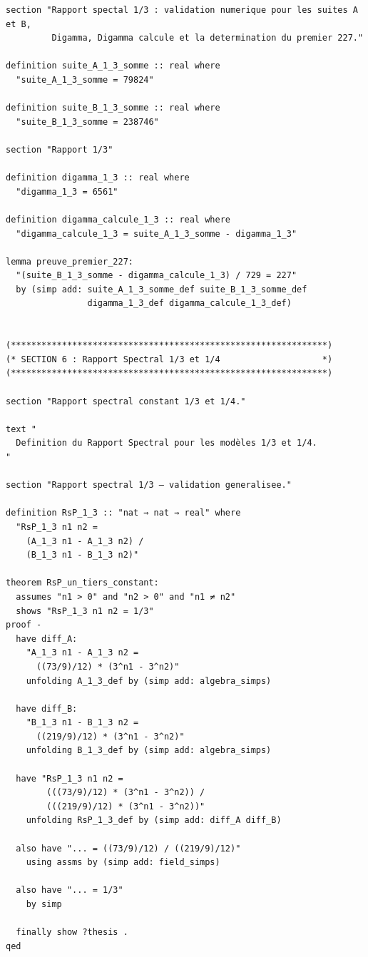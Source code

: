 \documentclass[a4paper,11pt]{article}
\begin{document}
\begin{holcode}[title={\textcolor{white}{File: methode\_spectral.thy -- Part 3/4}}]
\begin{lstlisting}
section "Rapport spectal 1/3 : validation numerique pour les suites A et B, 
         Digamma, Digamma calcule et la determination du premier 227."

definition suite_A_1_3_somme :: real where
  "suite_A_1_3_somme = 79824"

definition suite_B_1_3_somme :: real where
  "suite_B_1_3_somme = 238746"

section "Rapport 1/3"

definition digamma_1_3 :: real where
  "digamma_1_3 = 6561"

definition digamma_calcule_1_3 :: real where
  "digamma_calcule_1_3 = suite_A_1_3_somme - digamma_1_3"

lemma preuve_premier_227:
  "(suite_B_1_3_somme - digamma_calcule_1_3) / 729 = 227"
  by (simp add: suite_A_1_3_somme_def suite_B_1_3_somme_def
                digamma_1_3_def digamma_calcule_1_3_def)


(**************************************************************)
(* SECTION 6 : Rapport Spectral 1/3 et 1/4                    *)
(**************************************************************)

section "Rapport spectral constant 1/3 et 1/4."

text "
  Definition du Rapport Spectral pour les modèles 1/3 et 1/4.
"

section "Rapport spectral 1/3 – validation generalisee."

definition RsP_1_3 :: "nat ⇒ nat ⇒ real" where
  "RsP_1_3 n1 n2 =
    (A_1_3 n1 - A_1_3 n2) /
    (B_1_3 n1 - B_1_3 n2)"

theorem RsP_un_tiers_constant:
  assumes "n1 > 0" and "n2 > 0" and "n1 ≠ n2"
  shows "RsP_1_3 n1 n2 = 1/3"
proof -
  have diff_A:
    "A_1_3 n1 - A_1_3 n2 =
      ((73/9)/12) * (3^n1 - 3^n2)"
    unfolding A_1_3_def by (simp add: algebra_simps)

  have diff_B:
    "B_1_3 n1 - B_1_3 n2 =
      ((219/9)/12) * (3^n1 - 3^n2)"
    unfolding B_1_3_def by (simp add: algebra_simps)

  have "RsP_1_3 n1 n2 =
        (((73/9)/12) * (3^n1 - 3^n2)) /
        (((219/9)/12) * (3^n1 - 3^n2))"
    unfolding RsP_1_3_def by (simp add: diff_A diff_B)

  also have "... = ((73/9)/12) / ((219/9)/12)"
    using assms by (simp add: field_simps)

  also have "... = 1/3"
    by simp

  finally show ?thesis .
qed



\end{lstlisting}
\end{holcode}
\end{document}
